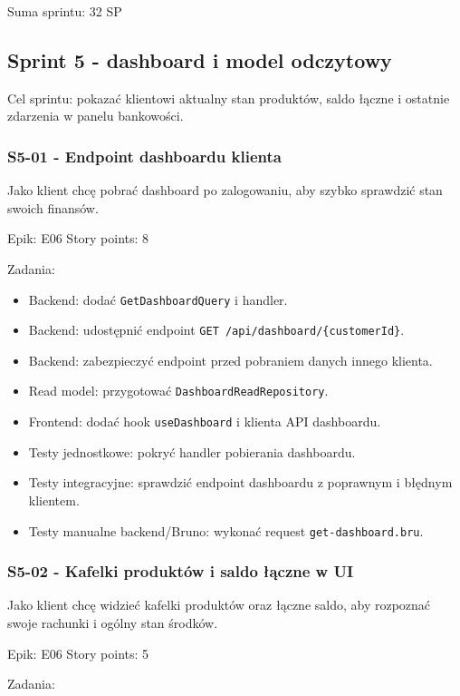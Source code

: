 \documentclass[12pt,a4paper]{article}
\begin{document}
Suma sprintu: 32 SP

\subsection*{Sprint 5 - dashboard i model odczytowy}

Cel sprintu: pokazać klientowi aktualny stan produktów, saldo łączne i ostatnie zdarzenia w panelu bankowości.

\subsubsection*{S5-01 - Endpoint dashboardu klienta}

Jako klient chcę pobrać dashboard po zalogowaniu, aby szybko sprawdzić stan swoich finansów.

Epik: E06
Story points: 8

Zadania:

\begin{itemize}
\item Backend: dodać \texttt{GetDashboardQuery} i handler.
\item Backend: udostępnić endpoint \texttt{GET /api/dashboard/\{customerId\}}.
\item Backend: zabezpieczyć endpoint przed pobraniem danych innego klienta.
\item Read model: przygotować \texttt{DashboardReadRepository}.
\item Frontend: dodać hook \texttt{useDashboard} i klienta API dashboardu.
\item Testy jednostkowe: pokryć handler pobierania dashboardu.
\item Testy integracyjne: sprawdzić endpoint dashboardu z poprawnym i błędnym klientem.
\item Testy manualne backend/Bruno: wykonać request \texttt{get-dashboard.bru}.
\end{itemize}

\subsubsection*{S5-02 - Kafelki produktów i saldo łączne w UI}

Jako klient chcę widzieć kafelki produktów oraz łączne saldo, aby rozpoznać swoje rachunki i ogólny stan środków.

Epik: E06
Story points: 5

Zadania:
\end{document}
